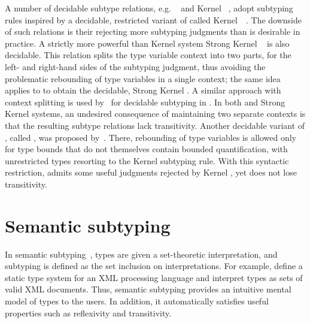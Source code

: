 A number of decidable subtype relations,
e.g. \WyvSelf~\cite{bib:mackay:path-dep-dec:2020}
and Kernel \DSub~\cite{bib:hu:dot-undec:2020},
adopt subtyping rules inspired by a decidable, restricted variant of \FSub
called Kernel~\FSub~\cite{bib:cardelli:types-poly:1985}.
The downside of such relations is their rejecting more subtyping judgments
than is desirable in practice.
A strictly more powerful than Kernel \DSub system
Strong Kernel \DSub~\cite{bib:hu:dot-undec:2020} is also decidable.
This relation splits the type variable context into two parts, for the left-
and right-hand sides of the subtyping judgment, thus avoiding the problematic
rebounding of type variables in a single context;
the same idea applies to \FSub to obtain the decidable, Strong Kernel \FSub.
A similar approach with context splitting is used
by~\citet{bib:mackay:path-dep-dec:2020} for decidable subtyping in \WyvFix.
In both \WyvFix and Strong Kernel systems,
an undesired consequence of maintaining two separate contexts
is that the resulting subtype relations lack transitivity.
Another decidable variant of \FSub, called \FSubR, was proposed
by~\citet{bib:mackay:bound-poly-sub-dec:2020}. There, %
rebounding of type variables is allowed
only for type bounds that do not themselves contain bounded quantification,
with unrestricted types resorting to the Kernel subtyping rule.
With this syntactic restriction, \FSubR admits some useful judgments
rejected by Kernel \FSub, yet does not lose transitivity.

\section{Semantic subtyping}

In semantic subtyping~\cite{bib:frisch:sem-sub:2008}, types are given a set-theoretic
interpretation, and subtyping is defined as the set inclusion on
interpretations.
For example, \citet{bib:hosoya:reg-types-XML:2000} define a static type system for
an XML processing language and interpret types as sets of valid XML documents.
Thus, semantic subtyping provides an intuitive mental
model of types to the users. In addition, it automatically satisfies
useful properties such as reflexivity and transitivity.

